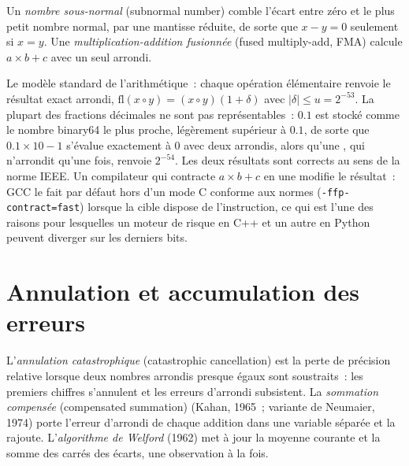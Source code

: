 \begin{definition}\label{def:qm:floating-point-and-numerical-linear-algebra:fma}
Un \emph{nombre sous-normal} (subnormal number) comble l'écart entre zéro et le plus petit nombre normal, par une mantisse réduite, de sorte que $x - y = 0$ seulement si $x = y$. Une
\emph{multiplication-addition fusionnée} (fused multiply-add, FMA) calcule $a \times b + c$ avec un seul arrondi.
\end{definition}

Le modèle standard de l'arithmétique~: chaque opération élémentaire renvoie le résultat exact arrondi, $\mathrm{fl}(x \circ y) = (x \circ y)(1 + \delta)$ avec $|\delta| \le u = 2^{-53}$. La plupart des fractions décimales
ne sont pas représentables~: $0.1$ est stocké comme le nombre binary64 le plus proche, légèrement supérieur à $0.1$, de sorte que $0.1 \times 10 - 1$ s'évalue exactement à 0 avec deux arrondis, alors qu'une , qui n'arrondit qu'une fois, renvoie $2^{-54}$. Les deux résultats sont corrects au sens de la norme IEEE. Un compilateur qui contracte $a \times b + c$ en une  modifie le résultat~: GCC le fait par
défaut hors d'un mode C conforme aux normes (\texttt{-ffp-contract=fast}) lorsque la cible dispose de l'instruction, ce qui est l'une des raisons pour lesquelles un moteur de risque en C++ et un autre en Python peuvent diverger
sur les derniers bits.

\section{Annulation et accumulation des erreurs}

\begin{definition}\label{def:qm:floating-point-and-numerical-linear-algebra:cancel}
L'\emph{annulation catastrophique} (catastrophic cancellation) est la perte de précision relative lorsque deux nombres arrondis presque égaux sont soustraits~: les premiers chiffres s'annulent et les
erreurs d'arrondi subsistent. La \emph{sommation compensée} (compensated summation) (Kahan, 1965~; variante de Neumaier, 1974) porte l'erreur d'arrondi de chaque addition dans une variable séparée
et la rajoute. L'\emph{algorithme de Welford} (1962) met à jour la moyenne courante et la somme des carrés des écarts, une observation à la fois.
\end{definition}

